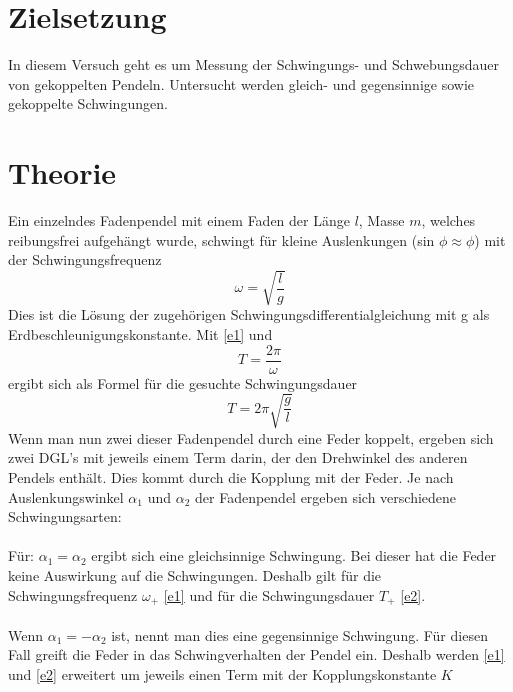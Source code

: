 \maketitle
\tableofcontents
\newpage

\section{Zielsetzung}
In diesem Versuch geht es um Messung der Schwingungs- und Schwebungsdauer von gekoppelten Pendeln.
Untersucht werden gleich- und gegensinnige sowie gekoppelte Schwingungen.
\section{Theorie}
Ein einzelndes Fadenpendel mit einem Faden der Länge $\textit{l}$, Masse $\textit{m}$, welches reibungsfrei aufgehängt wurde,
schwingt für kleine Auslenkungen (sin $\phi \approx \phi$) mit der Schwingungsfrequenz
\begin{equation}
  \omega = \sqrt{\frac{\textit{l}}{g}}
  \label{e1}
\end{equation}
Dies ist die Lösung der zugehörigen Schwingungsdifferentialgleichung mit g als Erdbeschleunigungskonstante. Mit \eqref{e1} und
\begin{equation*}
  \textit{T} = \frac{2\pi}{\omega}
\end{equation*}
ergibt sich als Formel für die gesuchte Schwingungsdauer
\begin{equation}
  \textit{T} = 2\pi \sqrt{\frac{g}{\textit{l}}}
  \label{e2}
\end{equation}
Wenn man nun zwei dieser Fadenpendel durch eine Feder koppelt, ergeben sich zwei DGL's mit jeweils einem Term darin,
der den Drehwinkel des anderen Pendels enthält. Dies kommt durch die Kopplung mit der Feder. Je nach Auslenkungswinkel $\alpha_{1}$
und $\alpha_{2}$ der Fadenpendel ergeben sich verschiedene Schwingungsarten:
\\
\\
Für: $\alpha_{1} = \alpha_{2}$ ergibt sich eine gleichsinnige Schwingung. Bei dieser hat die Feder keine Auswirkung auf die
Schwingungen. Deshalb gilt für die Schwingungsfrequenz $\omega_{+}$ \eqref{e1} und für die Schwingungsdauer $\textit{T}_{+}$
\eqref{e2}.
\\
\\
Wenn $\alpha_{1} = -\alpha_{2}$ ist, nennt man dies eine gegensinnige Schwingung. Für diesen Fall greift die Feder in das Schwingverhalten
der Pendel ein. Deshalb werden \eqref{e1} und \eqref{e2} erweitert um jeweils einen Term mit der Kopplungskonstante $\textit{K}$
